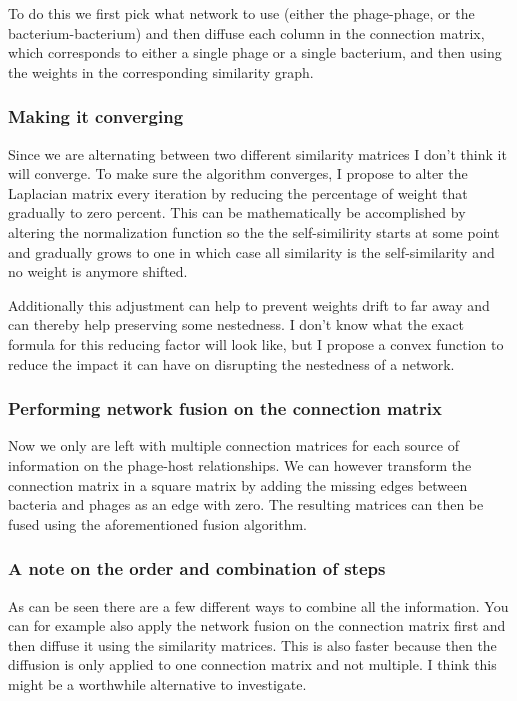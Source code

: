 \documentclass{article}
\begin{document}
To do this we first pick what network to use (either the phage-phage, or 
the bacterium-bacterium) and then diffuse each column in the connection matrix,
which corresponds to either a single phage or a single bacterium, and then 
using the weights in the corresponding similarity graph.

\subsubsection{Making it converging}

Since we are alternating between two different similarity matrices I don't think it will
converge. To make sure the algorithm converges, I propose to alter the
Laplacian matrix every iteration by reducing the percentage of weight
that gradually to zero percent.
This can be mathematically be accomplished by altering the normalization
function so the the self-similirity starts at some point and gradually 
grows to one in which case all similarity is the self-similarity and no
weight is anymore shifted.

Additionally this adjustment can help to prevent weights drift to far away and
can thereby help preserving some nestedness. I don't know
what the exact formula for this reducing factor will look like, but I propose
a convex function to reduce the impact it can have on disrupting the nestedness
of a network.

\subsubsection{Performing network fusion on the connection matrix}

Now we only are left with multiple connection matrices for each source of 
information on the phage-host relationships. We can however transform the
connection matrix in a square matrix by adding the missing edges between
bacteria and phages as an edge with zero. The resulting matrices can then
be fused using the aforementioned fusion algorithm.

\subsubsection{A note on the order and combination of steps}

As can be seen there are a few different ways to combine all the information.
You can for example also apply the network fusion on the connection matrix
first and then diffuse it using the similarity matrices. This is also 
faster because then the diffusion is only applied to one connection matrix
and not multiple. I think this might be a worthwhile alternative to investigate.
\end{document}
